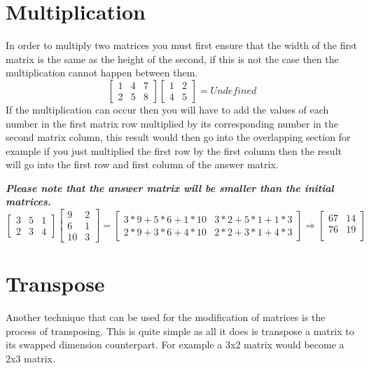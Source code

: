 \documentclass{article}
\begin{document}
\section{Multiplication}
In order to multiply two matrices you must first ensure that the width of the first matrix is the same as the height of the second, if this is not the case then the multiplication cannot happen between them.
\begin{equation*}
	\begin{bmatrix}
		1 & 4 & 7\\
		2 & 5 & 8
	\end{bmatrix}
	\begin{bmatrix}
		1 & 2\\
		4 & 5
	\end{bmatrix}
	=
	Undefined
\end{equation*}
If the multiplication can occur then you will have to add the values of each number in the first matrix row multiplied by its corresponding number in the second matrix column, this result would then go into the overlapping section for example if you just multiplied the first row by the first column then the result will go into the first row and first column of the answer matrix.

\textit{\textbf{Please note that the answer matrix will be smaller than the initial matrices.}}
\begin{equation*}
	\begin{bmatrix}
		3 & 5 & 1\\
		2 & 3 & 4
	\end{bmatrix}
	\begin{bmatrix}
		9 & 2\\
		6 & 1\\
		10 & 3
	\end{bmatrix}
	=
	\begin{bmatrix}
		3*9+5*6+1*10 & 3*2+5*1+1*3\\
		2*9+3*6+4*10 & 2*2+3*1+4*3
	\end{bmatrix}
	\Rightarrow
	\begin{bmatrix}
		67 & 14\\
		76 & 19\\
	\end{bmatrix}
\end{equation*}
\section{Transpose}
Another technique that can be used for the modification of matrices is the process of transposing. This is quite simple as all it does is transpose a matrix to its swapped dimension counterpart. For example a 3x2 matrix would become a 2x3 matrix.
\end{document}
